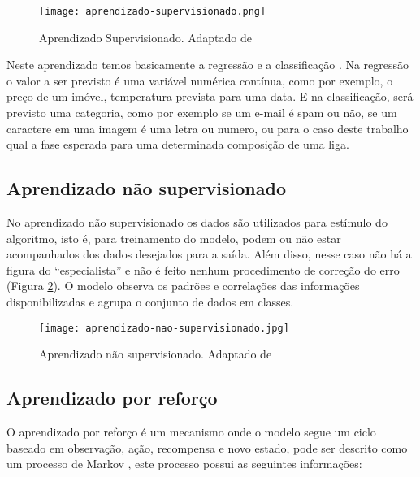 \begin{figure}[ht]
    \centering
    \texttt{[image: aprendizado-supervisionado.png]} 
    \caption{ Aprendizado Supervisionado. Adaptado de \cite{de2007redes}}
    \label{fig:aprendisado-supervisionado}
\end{figure}

Neste aprendizado temos basicamente a regressão e a classificação \cite{dangeti2017statistics}. Na regressão o valor a ser previsto é uma variável numérica contínua, como por exemplo, o preço de um imóvel, temperatura prevista para uma data. E na classificação, será previsto uma categoria, como por exemplo se um e-mail é spam ou não, se um caractere em uma imagem é uma letra ou numero, ou para o caso deste trabalho qual a fase esperada para uma determinada composição de uma liga.

\subsection{Aprendizado não supervisionado}\label{sec:LABEL_CHP_4_SEC_A_SUB_B}

No aprendizado não supervisionado os dados são utilizados para estímulo do algoritmo, isto é, para treinamento do modelo, podem ou não estar acompanhados dos dados desejados para a saída. Além disso, nesse caso não há a figura do ``especialista'' e não é feito nenhum procedimento de correção do erro (Figura \ref{fig:aprendizado-nao-supervisionado}). O modelo observa os padrões e correlações das informações disponibilizadas e agrupa o conjunto de dados em classes.

\begin{figure}[ht]
    \centering
    \texttt{[image: aprendizado-nao-supervisionado.jpg]} 
    \caption{ Aprendizado não supervisionado. Adaptado de \cite{de2007redes}}
    \label{fig:aprendizado-nao-supervisionado}
\end{figure}
\FloatBarrier

\subsection{Aprendizado por reforço}\label{sec:LABEL_CHP_4_SEC_A_SUB_C}

O aprendizado por reforço é um mecanismo onde o modelo segue um ciclo baseado em observação, ação, recompensa e novo estado, pode ser descrito como um processo de Markov \cite{fernando2020cadeiaMarkov}, este processo possui as seguintes informações:

